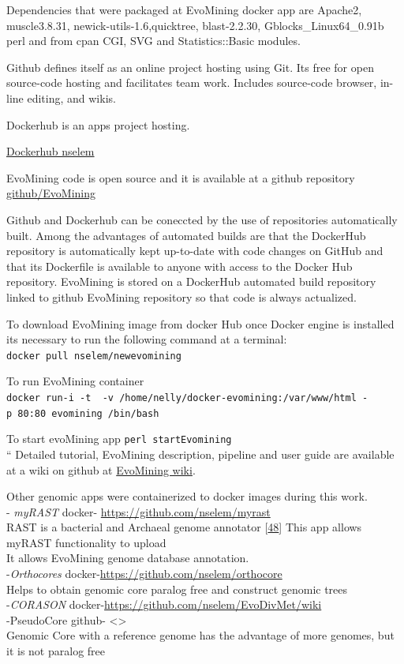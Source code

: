 \documentclass[12pt,twoside]{reedthesis}
\begin{document}
  Dependencies that were packaged at EvoMining docker app are Apache2,
  muscle3.8.31, newick-utils-1.6,quicktree, blast-2.2.30,
  Gblocks\_Linux64\_0.91b perl and from cpan CGI, SVG and
  Statistics::Basic modules.
  
  Github defines itself as an online project hosting using Git. Its free
  for open source-code hosting and facilitates team work. Includes
  source-code browser, in-line editing, and wikis.
  
  Dockerhub is an apps project hosting.
  
  \href{https://hub.docker.com/u/nselem/}{Dockerhub nselem}
  
  EvoMining code is open source and it is available at a github repository
  \href{https://github.com/nselem/EvoMining}{github/EvoMining}
  
  Github and Dockerhub can be coneccted by the use of repositories
  automatically built. Among the advantages of automated builds are that
  the DockerHub repository is automatically kept up-to-date with code
  changes on GitHub and that its Dockerfile is available to anyone with
  access to the Docker Hub repository. EvoMining is stored on a DockerHub
  automated build repository linked to github EvoMining repository so that
  code is always actualized.
  
  To download EvoMining image from docker Hub once Docker engine is
  installed its necessary to run the following command at a terminal:\\
  \texttt{docker\ pull\ nselem/newevomining}
  
  To run EvoMining container\\
  \texttt{docker\ run-i\ -t\ \ -v\ /home/nelly/docker-evomining:/var/www/html\ -p\ 80:80\ evomining\ /bin/bash}
  
  To start evoMining app \texttt{perl\ startEvomining}\\
  `` Detailed tutorial, EvoMining description, pipeline and user guide are
  available at a wiki on github at
  \href{https://github.com/nselem/EvoMining/wiki}{EvoMining wiki}.
  
  Other genomic apps were containerized to docker images during this
  work.\\
  - \emph{myRAST} docker- \url{https://github.com/nselem/myrast}\\
  RAST is a bacterial and Archaeal genome annotator
  {[}\protect\hyperlink{ref-azizux5frastux5f2008}{48}{]} This app allows
  myRAST functionality to upload\\
  It allows EvoMining genome database annotation.\\
  -\emph{Orthocores} docker-\url{https://github.com/nselem/orthocore}\\
  Helps to obtain genomic core paralog free and construct genomic trees\\
  -\emph{CORASON} docker-\url{https://github.com/nselem/EvoDivMet/wiki}\\
  -PseudoCore github- \textless{}\textgreater{}\\
  Genomic Core with a reference genome has the advantage of more genomes,
  but it is not paralog free
  
\end{document}
